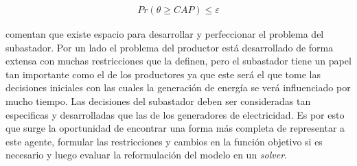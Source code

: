 \begin{equation}
\begin{array}{cl}
    Pr(\theta \geq CAP)\leq \varepsilon \label{res:subastador0}
\end{array}
\end{equation}
\vspace{2.5mm}

 comentan que existe espacio para desarrollar y perfeccionar el problema del subastador. Por un lado el problema del productor está desarrollado de forma extensa con muchas restricciones que la definen, pero el subastador tiene un papel tan importante como el de los productores ya que este será el que tome las decisiones iniciales con las cuales la generación de energía se verá influenciado por mucho tiempo. Las decisiones del subastador deben ser consideradas tan especificas y desarrolladas que las de los generadores de electricidad. Es por esto que surge la oportunidad de encontrar una forma más completa de representar a este agente, formular las restricciones y cambios en la función objetivo si es necesario y luego evaluar la reformulación del modelo en un \textit{solver}.



